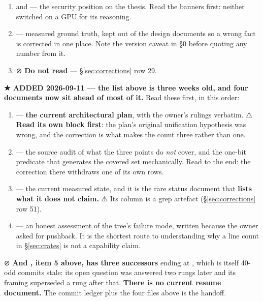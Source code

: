 \documentclass[10.5pt]{article}
\begin{document}
\begin{enumerate}
  walls that have since been crossed. They remain the best record of \emph{how} a wall gets
  characterised and of at least three sections marked \textbf{REFUTED} that were kept rather than
  deleted — \emph{read them for method, not for status.}
\item {} and
   — the security position on the
  thesis. Read the banners first: neither switched on a GPU for its reasoning.
\item {} — measured ground truth, kept out of the design documents so a wrong
  fact is corrected in one place. Note the version caveat in 
  \S0 before quoting any number from it.
\item ⊘ \textbf{Do not read } — \S\ref{sec:corrections}
  row 29.
\end{enumerate}

\begin{claimbox}\small
\textbf{★ ADDED 2026-09-11 --- the list above is three weeks old, and four documents now sit
ahead of most of it.} Read these first, in this order:
\begin{enumerate}[itemsep=0.2ex]
\item {} --- \textbf{the current
  architectural plan}, with the owner's rulings verbatim. ⚠ \textbf{Read its own  block first}: the plan's original unification hypothesis was wrong, and the
  correction is what makes the count three rather than one.
\item {} --- the source audit of what the
  three points do \emph{not} cover, and the one-bit predicate that generates the covered set
  mechanically. Read to the end: the correction there withdraws one of its own rows.
\item {} --- the current measured state,
  and it is the rare status document that \textbf{lists what it does not claim.} ⚠ Its
   column is a grep artefact (\S\ref{sec:corrections} row 51).
\item {} --- an honest assessment of the
  tree's failure mode, written because the owner asked for pushback. It is the shortest route to
  understanding why a line count in \S\ref{sec:crates} is not a capability claim.
\end{enumerate}
⊘ \textbf{And , item 5 above, has three successors} ending at
, which is itself 40-odd commits stale: its open question was answered
two rungs later and its framing superseded a rung after that. \textbf{There is no current resume
document.} The commit ledger plus the four files above is the handoff.
\end{claimbox}
\end{document}
